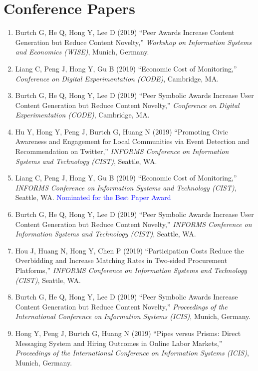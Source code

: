 \documentclass[paper=letter,fontsize=10pt]{scrartcl} %
\newcommand{\NewPart}[2]{\section*{{#1} #2}}
\newcommand{\ConfEntry}[6]{
		\noindent #1 (#2) ``#3,'' \textit{#4}, #5. \textcolor{blue}{#6}}
\newcommand{\Hong}{Hong Y}
\begin{document}
\NewPart{Conference Papers}{}
\begin{enumerate}

\item \ConfEntry{Burtch G, He Q, \Hong, Lee D}{2019}{Peer Awards Increase Content Generation but Reduce Content Novelty}{Workshop on Information Systems and Economics (WISE)}{Munich, Germany}{}

\item \ConfEntry{Liang C, Peng J, \Hong, Gu B}{2019}{Economic Cost of Monitoring}{Conference on Digital Experimentation (CODE)}{Cambridge, MA}{}

\item \ConfEntry{Burtch G, He Q, \Hong, Lee D}{2019}{Peer Symbolic Awards Increase User Content Generation but Reduce Content Novelty}{Conference on Digital Experimentation (CODE)}{Cambridge, MA}{}

\item \ConfEntry{Hu Y, \Hong, Peng J, Burtch G, Huang N}{2019}{Promoting Civic Awareness and Engagement for Local Communities via Event Detection and Recommendation on Twitter}{INFORMS Conference on Information Systems and Technology (CIST)}{Seattle, WA}{}

\item \ConfEntry{Liang C, Peng J, \Hong, Gu B}{2019}{Economic Cost of Monitoring}{INFORMS Conference on Information Systems and Technology (CIST)}{Seattle, WA}{\protect\newline Nominated for the Best Paper Award}

\item \ConfEntry{Burtch G, He Q, \Hong, Lee D}{2019}{Peer Symbolic Awards Increase User Content Generation but Reduce Content Novelty}{INFORMS Conference on Information Systems and Technology (CIST)}{Seattle, WA}{}

\item \ConfEntry{Hou J, Huang N, \Hong, Chen P}{2019}{Participation Costs Reduce the Overbidding and Increase Matching Rates in Two-sided Procurement Platforms}{INFORMS Conference on Information Systems and Technology (CIST)}{Seattle, WA}{}

\item \ConfEntry{Burtch G, He Q, \Hong, Lee D}{2019}{Peer Symbolic Awards Increase Content Generation but Reduce Content Novelty}{Proceedings of the International Conference on Information Systems (ICIS)}{Munich, Germany}{}

\item \ConfEntry{\Hong, Peng J, Burtch G, Huang N}{2019}{Pipes versus Prisms: Direct Messaging System and Hiring Outcomes in Online Labor Markets}{Proceedings of the International Conference on Information Systems (ICIS)}{Munich, Germany}{}


\end{enumerate}
\end{document}
